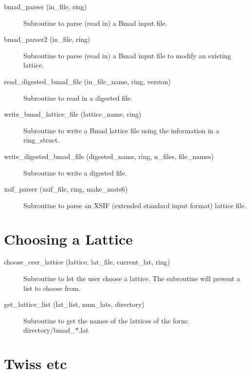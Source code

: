 \begin{description}

\item[bmad\_parser (in\_file, ring)] \Newline
Subroutine to parse (read in) a Bmad input file. 

\item[bmad\_parser2 (in\_file, ring)] \Newline
Subroutine to parse (read in) a Bmad input file to modify an existing lattice. 

\item[read\_digested\_bmad\_file (in\_file\_name, ring, version)] \Newline
Subroutine to read in a digested file. 

\item[write\_bmad\_lattice\_file (lattice\_name, ring)] \Newline 
Subroutine to write a Bmad lattice file using the information in
a ring\_struct.

\item[write\_digested\_bmad\_file (digested\_name, ring, n\_files, file\_names)] \Newline
Subroutine to write a digested file. 

\item[xsif\_parser (xsif\_file, ring, make\_mats6)] \Newline 
     Subroutine to parse an XSIF (extended standard input format) lattice file.

\end{description}

\section{Choosing a Lattice}
\label{r:lat}

\begin{description}

\item[choose\_cesr\_lattice (lattice, lat\_file, current\_lat, ring)] \Newline
Subroutine to let the user choose a lattice. The subroutine will present a list to choose from. 

\item[get\_lattice\_list (lat\_list, num\_lats, directory)] \Newline
Subroutine to get the names of the lattices of the form: directory/bmad\_*.lat 

\end{description}

\section{Twiss etc}
\label{r:twiss}

